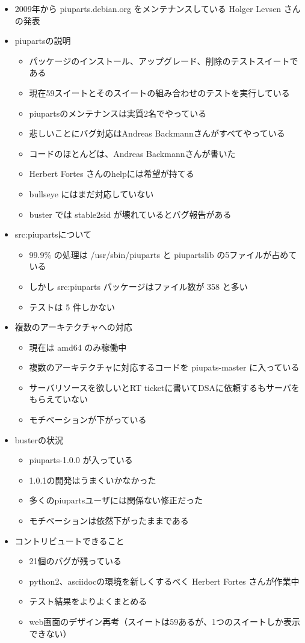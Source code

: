 \documentclass[mingoth,a4paper]{jsarticle}
\begin{document}
\begin{itemize}
\item 2009年から piuparts.debian.org をメンテナンスしている Holger Levsen さんの発表 
\item piupartsの説明
  \begin{itemize}
  \item パッケージのインストール、アップグレード、削除のテストスイートである
  \item 現在59スイートとそのスイートの組み合わせのテストを実行している
  \item piupartsのメンテナンスは実質2名でやっている
  \item 悲しいことにバグ対応はAndreas Backmannさんがすべてやっている
  \item コードのほとんどは、Andreas Backmannさんが書いた
  \item Herbert Fortes さんのhelpには希望が持てる
  \item bullseye にはまだ対応していない
  \item buster では stable2sid が壊れているとバグ報告がある
  \end{itemize}
\item src:piupartsについて
  \begin{itemize}
  \item 99.9\% の処理は /usr/sbin/piuparts と piupartslib の5ファイルが占めている
  \item しかし src:piuparts パッケージはファイル数が 358 と多い
  \item テストは 5 件しかない
  \end{itemize}
\item 複数のアーキテクチャへの対応
  \begin{itemize}
  \item 現在は amd64 のみ稼働中
  \item 複数のアーキテクチャに対応するコードを piupats-master に入っている
  \item サーバリソースを欲しいとRT ticketに書いてDSAに依頼するもサーバをもらえていない
  \item モチベーションが下がっている
  \end{itemize}
\item busterの状況
  \begin{itemize}
  \item piuparts-1.0.0 が入っている
  \item 1.0.1の開発はうまくいかなかった
  \item 多くのpiupartsユーザには関係ない修正だった
  \item モチベーションは依然下がったままである
  \end{itemize}
\item コントリビュートできること
  \begin{itemize}
  \item 21個のバグが残っている
  \item python2、asciidocの環境を新しくするべく Herbert Fortes さんが作業中
  \item テスト結果をよりよくまとめる
  \item web画面のデザイン再考（スイートは59あるが、1つのスイートしか表示できない）
  \end{itemize}
\end{itemize}
\end{document}
